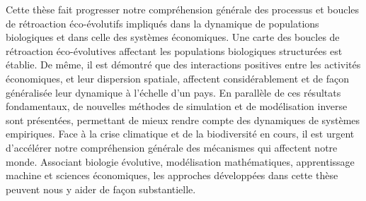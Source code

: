 {Cette thèse fait progresser notre compréhension générale des processus et boucles de rétroaction éco-évolutifs impliqués dans la dynamique de populations biologiques et dans celle des systèmes économiques. Une carte des boucles de rétroaction éco-évolutives affectant les populations biologiques structurées est établie. De même, il est démontré que des interactions positives entre les activités économiques, et leur dispersion spatiale, affectent considérablement et de façon généralisée leur dynamique à l'échelle d'un pays. En parallèle de ces résultats fondamentaux, de nouvelles méthodes de simulation et de modélisation inverse sont présentées, permettant de mieux rendre compte des dynamiques de systèmes empiriques. Face à la crise climatique et de la biodiversité en cours, il est urgent d'accélérer notre compréhension générale des mécanismes qui affectent notre monde. Associant biologie évolutive, modélisation mathématiques, apprentissage machine et sciences économiques, les approches développées dans cette thèse peuvent nous y aider de façon substantielle.}

